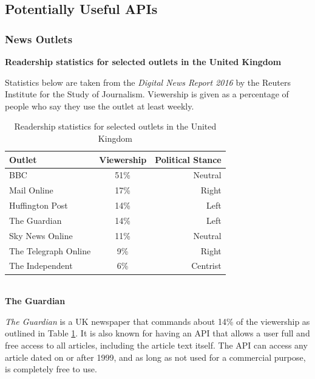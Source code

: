 \documentclass[12pt]{article}
\begin{document}
\subsection{Potentially Useful APIs}

\subsubsection{News Outlets}

\textbf{Readership statistics for selected outlets in the United Kingdom}

Statistics below are taken from the \emph{Digital News Report 2016}\cite{digitalNewsReport} by the Reuters Institute for the Study of Journalism\cite{reutersInstitute}. Viewership is given as a percentage of people who say they use the outlet at least weekly.

\begin{table}[H]
	\centering
	\begin{tabular}{l|c|r}
		\textbf{Outlet} & \textbf{Viewership} & \textbf{Political Stance} \\ \hline
		BBC\index{BBC} & 51\% & Neutral \\ \hline
		Mail Online\index{Mail Online} & 17\% & Right \\ \hline
		Huffington Post\index{Huffington Post} & 14\% & Left \\ \hline
		The Guardian & 14\% & Left \\ \hline
		Sky News Online\index{Sky News} & 11\% & Neutral \\ \hline
		The Telegraph Online\index{Telegraph, The} & 9\% & Right \\ \hline
		The Independent\index{Independent, The} & 6\% & Centrist \\ \hline
	\end{tabular}
	\caption[Readership statistics for selected UK outlets]{Readership statistics for selected outlets in the United Kingdom}
	\label{viewershipFigures}
\end{table}

\textbf{\\The Guardian\cite{guardian}}

\emph{The Guardian} is a UK newspaper that commands about 14\% of the viewership as outlined in Table \ref{viewershipFigures}. It is also known for having an API that allows a user full and free access to all articles, including the article text itself. The API can access any article dated on or after 1999, and as long as not used for a commercial purpose, is completely free to use. 
\end{document}

